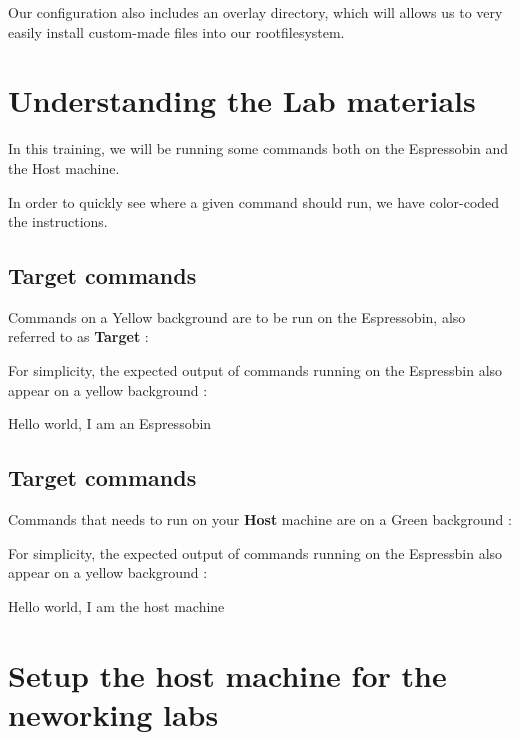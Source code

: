 Our configuration also includes an overlay directory, which will allows us to very easily
install custom-made files into our rootfilesystem.

\section{Understanding the Lab materials}

In this training, we will be running some commands both on the Espressobin and the Host machine.

In order to quickly see where a given command should run, we have color-coded the instructions.

\subsection{Target commands}

Commands on a Yellow background are to be run on the Espressobin, also referred to as \textbf{Target} :


For simplicity, the expected output of commands running on the Espressbin also appear on a yellow background :
\begin{targetterminaloutput}
Hello world, I am an Espressobin
\end{targetterminaloutput}

\subsection{Target commands}

Commands that needs to run on your \textbf{Host} machine are on a Green background :

For simplicity, the expected output of commands running on the Espressbin also appear on a yellow background :
\begin{hostterminaloutput}
Hello world, I am the host machine
\end{hostterminaloutput}

\section{Setup the host machine for the neworking labs}

